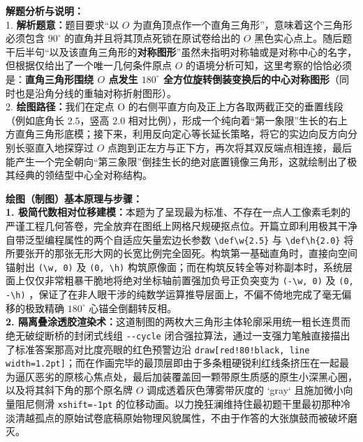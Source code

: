 \documentclass[12pt, a4paper]{ctexrep}
\begin{document}
{\small\color{gray}
\textbf{解题分析与说明：}\\
1. \textbf{解析题意：}题目要求“以 $O$ 为直角顶点作一个直角三角形”，意味着这个三角形必须包含 $90^\circ$ 的直角并且将其顶点死锁在原试卷给出的 $O$ 黑色实心点上。随后题干后半句“以及该直角三角形的\textbf{对称图形}”虽然未指明对称轴或是对称中心的名字，但根据仅给出了一个唯一几何条件原点 $O$ 的语境分析可知，这里考察的恰恰必须是：\textbf{直角三角形围绕 $O$ 点发生 $180^\circ$ 全方位旋转倒装变换后的中心对称图形}（同时也是沿角分线的重轴对称折射图形）。\\
2. \textbf{绘图路径：}我们在定点 O 的右侧平直方向及正上方各取两截正交的垂置线段（例如底角长 $2.5$，竖高 $2.0$ 相对比例），形成一个纯向着“第一象限”生长的右上方直角三角形底模；接下来，利用反向定心等长延长策略，将它的实边向反方向分别长驱直入地探穿过 $O$ 点跑到正左方与正下方，再次将其双反端点相连接，最后能产生一个完全朝向“第三象限”倒挂生长的绝对底置镜像三角形，这就绘制出了极其经典的领结型中心全对称结构。
}

\vspace{0.6cm}

{\small\color{blue!70!black}
\textbf{绘图（制图）基本原理与步骤：}\\
\textbf{1. 极简代数相对位移建模：}本题为了呈现最为标准、不存在一点人工像素毛刺的严谨工程几何答卷，完全放弃在图纸上网格尺规硬抠点位。开篇立即利用极其干净自带泛型编程属性的两个自适应矢量宏边长参数 \texttt{\textbackslash def\textbackslash w\{2.5\}} 与 \texttt{\textbackslash def\textbackslash h\{2.0\}} 将所要张开的那张无形大网的长宽比例完全固死。构筑第一基础直角时，直接向空间锚射出 \texttt{(\textbackslash w, 0)} 及 \texttt{(0, \textbackslash h)} 构筑原像面；而在构筑反转全等对称副本时，系统层面上仅仅非常粗暴干脆地将绝对坐标轴前置强加负号正负突变为 \texttt{(-\textbackslash w, 0)} 及 \texttt{(0, -\textbackslash h)} ，保证了在非人眼干涉的纯数学运算推导层面上，不偏不倚地完成了毫无偏移的极致精确 $180^\circ$ 心锚全倒翻转反相。\\
\textbf{2. 隔离叠涂透胶渲染术：}这道制图的两枚大三角形主体轮廓采用统一粗长连贯而绝无破绽断桥的封闭式线组 \texttt{-{}-cycle} 闭合强拉算法，通过一支强力笔触直接描出了标准答案那高对比度亮眼的红色预警边沿 \texttt{draw[red!80!black, line width=1.2pt]}；而在作画完毕的最顶层即由于多条粗硬锐利红线条挤压在一起最为逼仄恶劣的原核心焦点处，最后加装覆盖回一颗带原生质感的原生小深黑心圈，以及将其斜下角的那个原名牌 $O$ 调成透着灰色薄雾带灰度的 `gray` 且施加微小向量阻尼侧滑 \texttt{xshift=-1pt} 的位移动画。以力挽狂澜维持住最初题干里最初那种冷淡清越孤点的原始试卷底稿原始物理风貌属性，不由于作答的大张旗鼓而被破坏磨灭。
}
\end{document}
